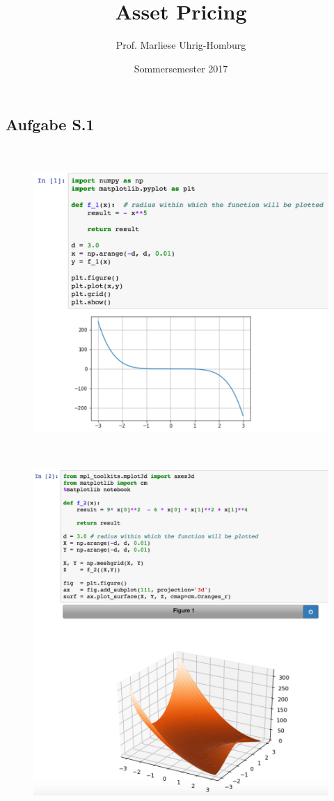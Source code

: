 \documentclass[12pt]{extreport} %
\title{Asset Pricing}
\author{Prof. Marliese Uhrig-Homburg}
\date{Sommersemester 2017}
\theoremstyle{named}
\theoremstyle{nnamed}
\theoremstyle{itshape}
\theoremstyle{normal}
\begin{document}
\thispagestyle{empty}


\subsection*{Aufgabe S.1} ~\\

\begin{figure}[h!]
  \centering
  \includegraphics[scale=0.325]{img/sui-i}
  \label{fig:sub1}
\end{figure} ~\\

\begin{figure}[h!]
  \centering
  \includegraphics[scale=0.35]{img/sui-ii}
  \label{fig:sub2}
\end{figure}
\end{document}
